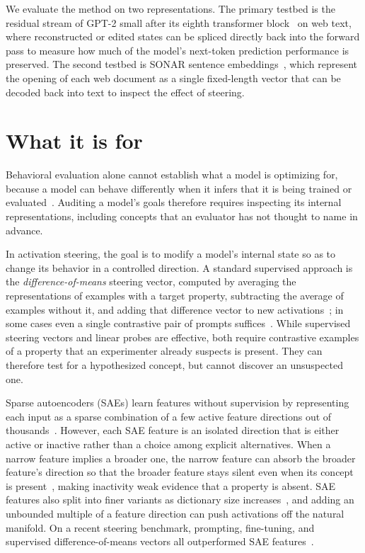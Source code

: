 \documentclass[11pt]{article}
\begin{document}
We evaluate the method on two representations. The primary testbed is the
residual stream of GPT-2 small after its eighth transformer
block~\cite{radford2019} on web text, where reconstructed or edited states
can be spliced directly back into the forward pass to measure how much of
the model's next-token prediction performance is preserved. The second
testbed is SONAR sentence embeddings~\cite{sonar}, which represent the
opening of each web document as a single fixed-length vector that can be
decoded back into text to inspect the effect of steering.

\section*{What it is for}

Behavioral evaluation alone cannot establish what a model is optimizing
for, because a model can behave differently when it infers that it is
being trained or evaluated~\cite{greenblatt2024}. Auditing a model's goals
therefore requires inspecting its internal representations, including
concepts that an evaluator has not thought to name in advance.

In activation steering, the goal is to modify a model's internal state so
as to change its behavior in a controlled direction. A standard supervised
approach is the \emph{difference-of-means} steering vector, computed by
averaging the representations of examples with a target property,
subtracting the average of examples without it, and adding that difference
vector to new activations~\cite{rimsky2024}; in some cases even a single
contrastive pair of prompts suffices~\cite{turner2024}. While supervised
steering vectors and linear probes are effective, both require contrastive
examples of a property that an experimenter already suspects is present.
They can therefore test for a hypothesized concept, but cannot discover an
unsuspected one.

Sparse autoencoders (SAEs) learn features without supervision by
representing each input as a sparse combination of a few active feature
directions out of thousands~\cite{bricken2023,gao2024}. However, each SAE
feature is an isolated direction that is either active or inactive rather
than a choice among explicit alternatives. When a narrow feature implies a
broader one, the narrow feature can absorb the broader feature's direction
so that the broader feature stays silent even when its concept is
present~\cite{chanin2025}, making inactivity weak evidence that a property
is absent. SAE features also split into finer variants as dictionary size
increases~\cite{bussmann2025}, and adding an unbounded multiple of a
feature direction can push activations off the natural manifold. On a
recent steering benchmark, prompting, fine-tuning, and supervised
difference-of-means vectors all outperformed SAE
features~\cite{wu2025axbenchsteeringllmssimple}.
\end{document}
